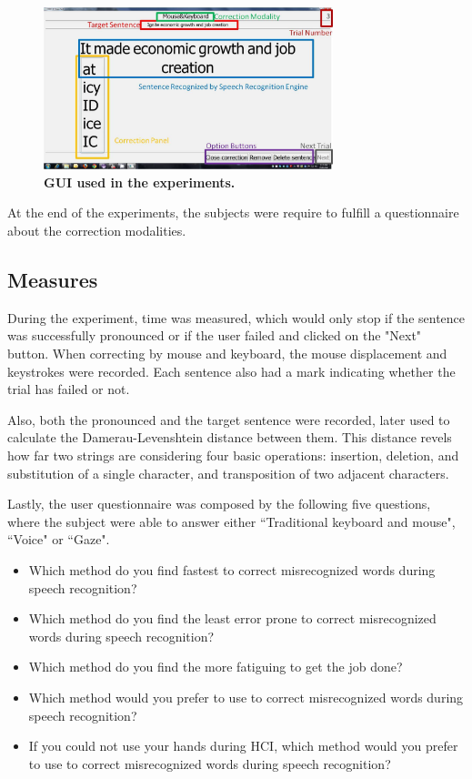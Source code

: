 \documentclass[]{article}
\begin{document}
\begin{figure}[ht]
\begin{center}
\includegraphics[width=0.75\textwidth]{figures/guiExampleEdited.jpg}
\end{center}
\caption{\textbf{GUI used in the experiments.}}
\label{guiExampleEdited}
\end{figure}


At the end of the experiments, the subjects were require to fulfill a questionnaire about the correction modalities.


\subsection{Measures}
During the experiment, time was measured, which would only stop if the sentence was successfully pronounced or if the user
failed and clicked on the "Next" button. When correcting by mouse and keyboard, the mouse displacement and keystrokes were recorded.
Each sentence also had a mark indicating whether the trial has failed or not.


Also, both the pronounced and the target sentence were recorded, later used to calculate the Damerau-Levenshtein
distance \cite{Damerau1964} between them. This distance revels how far two strings are considering four basic operations: insertion,
deletion, and substitution of a single character, and transposition of two adjacent characters.

Lastly, the user questionnaire was composed by the following five questions, where the subject were able to answer either ``Traditional keyboard and mouse",
``Voice" or ``Gaze".


\begin{itemize}
  \item Which method do you find fastest to correct misrecognized words during speech recognition?
	\item Which method do you find the least error prone to correct misrecognized words during speech recognition?
	\item Which method do you find the more fatiguing to get the job done?
	\item Which method would you prefer to use to correct misrecognized words during speech recognition?
	\item If you could not use your hands during HCI, which method would you prefer to use to correct misrecognized words during speech recognition?
\end{itemize}
\end{document}
